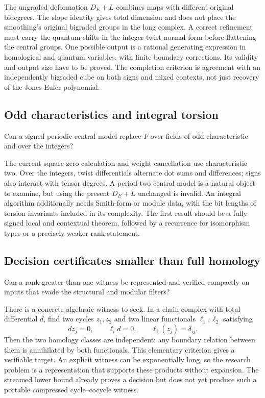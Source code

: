 The ungraded deformation \(D_E+L\) combines maps with different original
bidegrees. The slope identity gives total dimension and does not place
the smoothing's original bigraded groups in the long complex.
A correct refinement must carry the quantum shifts in the integer-twist
normal form before flattening the central groups.
One possible output is a rational generating expression in homological
and quantum variables, with finite boundary corrections. Its validity
and output size have to be proved.
The completion criterion is agreement with an independently bigraded
cube on both signs and mixed contexts, not just recovery of the Jones
Euler polynomial.

\subsection{Odd characteristics and integral torsion}

\begin{question}\label{q:integral}
Can a signed periodic central model replace \(F\) over fields of odd
characteristic and over the integers?
\end{question}

The current square-zero calculation and weight cancellation use
characteristic two. Over the integers, twist differentials alternate
dot sums and differences; signs also interact with tensor degrees.
A period-two central model is a natural object to examine, but using
the present \(D_E+L\) unchanged is invalid.
An integral algorithm additionally needs Smith-form or module data,
with the bit lengths of torsion invariants included in its complexity.
The first result should be a fully signed local and contextual theorem,
followed by a recurrence for isomorphism types or a precisely weaker
rank statement.

\subsection{Decision certificates smaller than full homology}

\begin{question}\label{q:certificate}
Can a rank-greater-than-one witness be represented and verified compactly
on inputs that evade the structural and modular filters?
\end{question}

There is a concrete algebraic witness to seek. In a chain complex with
total differential \(d\), find two cycles \(z_1,z_2\) and two linear
functionals \(\ell_1,\ell_2\) satisfying
\[
dz_j=0,\qquad \ell_i d=0,\qquad \ell_i(z_j)=\delta_{ij}.
\]
Then the two homology classes are independent: any boundary relation
between them is annihilated by both functionals. This elementary
criterion gives a verifiable target.
An explicit witness can be exponentially long, so the research problem
is a representation that supports these products without expansion.
The streamed lower bound already proves a decision but does not yet
produce such a portable compressed cycle--cocycle witness.

